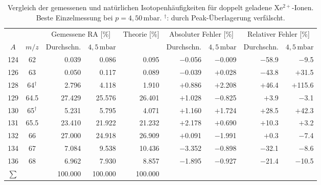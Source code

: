\documentclass{article}
\begin{document}
\begin{table}[htbp]
    \centering
    \caption{Vergleich der gemessenen und natürlichen Isotopenhäufigkeiten
        für doppelt geladene Xe$^{2+}$-Ionen. Beste Einzelmessung bei
        $p = 4{,}50\,\mathrm{mbar}$. $^\dagger$: durch Peak-Überlagerung
        verfälscht.}
    \label{tab:xe2}
    \begin{adjustbox}{max width=\textwidth}
    \begin{tabular}{c c r r r r r r r}
        \toprule
        & & \multicolumn{2}{c}{Gemessene RA [\%]}
        & {Theorie [\%]}
        & \multicolumn{2}{c}{Absoluter Fehler [\%]}
        & \multicolumn{2}{c}{Relativer Fehler [\%]} \\
        \cmidrule(lr){3-4}\cmidrule(lr){6-7}\cmidrule(lr){8-9}
        $A$ & $m/z$ & Durchschn. & $4{,}5\,\mathrm{mbar}$ &
        & Durchschn. & $4{,}5\,\mathrm{mbar}$
        & Durchschn. & $4{,}5\,\mathrm{mbar}$ \\
        \midrule
        124 & 62           &  0.039 &  0.086 &  0.095 & $-$0.056 & $-$0.009 & $-$58.9 &  $-$9.5 \\
        126 & 63           &  0.050 &  0.117 &  0.089 & $-$0.039 & $+$0.028 & $-$43.8 & $+$31.5 \\
        128 & 64$^\dagger$ &  2.796 &  4.118 &  1.910 & $+$0.886 & $+$2.208 & $+$46.4 & $+$115.6 \\
        129 & 64.5         & 27.429 & 25.576 & 26.401 & $+$1.028 & $-$0.825 &  $+$3.9 &  $-$3.1 \\
        130 & 65$^\dagger$ &  5.231 &  5.795 &  4.071 & $+$1.160 & $+$1.724 & $+$28.5 & $+$42.3 \\
        131 & 65.5         & 23.410 & 21.922 & 21.232 & $+$2.178 & $+$0.690 & $+$10.3 &  $+$3.2 \\
        132 & 66           & 27.000 & 24.918 & 26.909 & $+$0.091 & $-$1.991 &  $+$0.3 &  $-$7.4 \\
        134 & 67           &  7.084 &  9.538 & 10.436 & $-$3.352 & $-$0.898 & $-$32.1 &  $-$8.6 \\
        136 & 68           &  6.962 &  7.930 &  8.857 & $-$1.895 & $-$0.927 & $-$21.4 & $-$10.5 \\
        \midrule
        $\sum$ & & 100.000 & 100.000 & 100.000 & & & & \\
        \bottomrule
    \end{tabular}
    \end{adjustbox}
\end{table}
\end{document}
